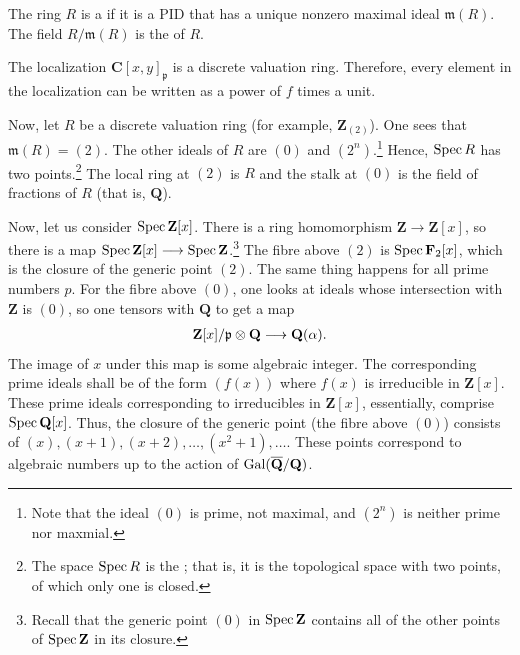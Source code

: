 \documentclass [11 pt, oneside, margin = 1 in] {article}
\begin{document}
\begin{definition}[ ]\label{}
The ring $R$ is a  if it is a PID that has a unique nonzero maximal ideal $\mathfrak{m}(R)$. The field $R/\mathfrak{m}(R)$ is the  of $R$. 
\end{definition}

\begin{remark}
The localization $\mathbf{C}[x,y]_\mathfrak{p}$ is a discrete valuation ring. Therefore, every element in the localization can be written as a power of $f$ times a unit.	
\end{remark}

Now, let $R$ be a discrete valuation ring (for example, $\mathbf{Z}_{(2)}$). One sees that $\mathfrak{m}(R) =  (2) $. The other ideals of $R$ are $(0)$ and $(2^n)$.\footnote{Note that the ideal $(0)$ is prime, not maximal, and $(2^n)$ is neither prime nor maxmial.} Hence, $\operatorname{Spec} R$ has two points.\footnote{The space $\operatorname{Spec} R$ is the ; that is, it is the topological space with two points, of which only one is closed.} The local ring at $(2)$ is $R$ and the stalk at $(0)$ is the field of fractions of $R$ (that is, $\mathbf{Q}$).

Now, let us consider $\operatorname{Spec} \mathbf{Z}[x] $. There is a ring homomorphism $\mathbf{Z}\longrightarrow \mathbf{Z}[x]$, so there is a map $\operatorname{Spec} \mathbf{Z}[x] \longrightarrow \operatorname{Spec} \mathbf{Z}$.\footnote{Recall that the generic point $(0)$ in $\operatorname{Spec} \mathbf{Z}$ contains all of the other points of $\operatorname{Spec}\mathbf{Z}$ in its closure.} The fibre above $(2)$ is $\operatorname{Spec}\mathbf{F}_{2}[x]$, which is the closure of the generic point $(2)$. The same thing happens for all prime numbers $p$. For the fibre above $(0)$, one looks at ideals whose intersection with $\mathbf{Z}$ is $(0)$, so one tensors with $\mathbf{Q}$ to get a map
\begin{align*}
	\mathbf{Z}[x]/\mathfrak{p}\otimes \mathbf{Q}\longrightarrow \mathbf{Q}(\alpha). 
\end{align*}
The image of $x$ under this map is some algebraic integer. The corresponding prime ideals shall be of the form $(f(x))$ where $f(x) $ is irreducible in $\mathbf{Z}[x]$. These prime ideals corresponding to irreducibles in $\mathbf{Z}[x]$, essentially, comprise $\operatorname{Spec} \mathbf{Q}[x]$. Thus, the closure of the generic point (the fibre above $(0)$) consists of $(x),  (x+1), (x+2),\hdots,  (x^2+1),\hdots$. These points correspond to algebraic numbers up to the action of $\operatorname{Gal} (\overline{\mathbf{Q}}/\mathbf{Q})$.
\end{document}
